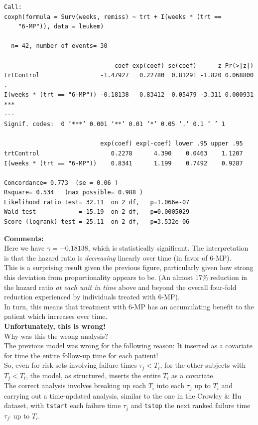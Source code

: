 \documentclass[10pt]{book}
\begin{document}
\small
\begin{verbatim}
Call:
coxph(formula = Surv(weeks, remiss) ~ trt + I(weeks * (trt ==
    "6-MP")), data = leukem)

  n= 42, number of events= 30

                               coef exp(coef) se(coef)      z Pr(>|z|)
trtControl                 -1.47927   0.22780  0.81291 -1.820 0.068800 .
I(weeks * (trt == "6-MP")) -0.18138   0.83412  0.05479 -3.311 0.000931 ***
---
Signif. codes:  0 ‘***’ 0.001 ‘**’ 0.01 ‘*’ 0.05 ‘.’ 0.1 ‘ ’ 1

                           exp(coef) exp(-coef) lower .95 upper .95
trtControl                    0.2278      4.390    0.0463    1.1207
I(weeks * (trt == "6-MP"))    0.8341      1.199    0.7492    0.9287

Concordance= 0.773  (se = 0.06 )
Rsquare= 0.534   (max possible= 0.988 )
Likelihood ratio test= 32.11  on 2 df,   p=1.066e-07
Wald test            = 15.19  on 2 df,   p=0.0005029
Score (logrank) test = 25.11  on 2 df,   p=3.532e-06

\end{verbatim}
\normalsize
{\bf Comments:}\\[2ex]
Here we have $\gamma=-0.18138$, which is statistically significant.  The interpretation is that the hazard ratio is \textit{decreasing} linearly over time (in favor of 6-MP).\\[2ex]
This is a surprising result given the previous figure, particularly given how strong this deviation from proportionality appears to be. (An almost 17\% reduction in the hazard ratio \textit{at each unit in time} above and beyond the overall four-fold reduction experienced by individuals treated with 6-MP).\\[2ex]
In turn, this means that treatment with 6-MP has an accumulating benefit to the patient which increases over time.\\[2ex]
{\bf Unfortunately, this is wrong!}
\\[2ex]
Why was this the wrong analysis?\\[2ex]
The previous model was wrong for the following reason:  It inserted as a covariate for time the entire follow-up time for each patient!\\[2ex]
So, even for risk sets involving failure times $\tau_j<T_i$, for the other subjects with $T_j<T_i$, the model, as structured, inserts the entire $T_i$ as a covariate.\\[2ex]
The correct analysis involves breaking up each $T_i$ into each $\tau_j$ up to $T_i$ and carrying out a time-updated analysis, similar to the one in the Crowley \& Hu dataset, with {\tt tstart} each failure time $\tau_j$ and {\tt tstop} the next ranked failure time $\tau_{j'}$ up to $T_i$. \\[2ex]
\end{document}
